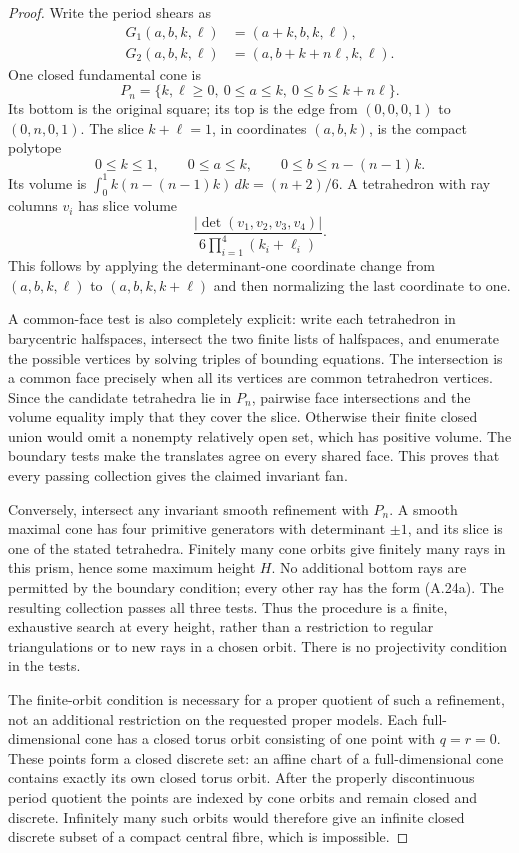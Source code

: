 \begin{proof}
Write the period shears as
\begin{align*}
 G_1(a,b,k,\ell)&=(a+k,b,k,\ell),\\
 G_2(a,b,k,\ell)&=(a,b+k+n\ell,k,\ell).
\end{align*}
One closed fundamental cone is
\[
 P_n=\{k,\ell\geq0,\ 0\leq a\leq k,
                    \ 0\leq b\leq k+n\ell\}.
\]
Its bottom is the original square; its top is the edge from
$(0,0,0,1)$ to $(0,n,0,1)$. The slice $k+\ell=1$, in
coordinates $(a,b,k)$, is the compact polytope
\[
 0\leq k\leq1,\qquad0\leq a\leq k,
 \qquad0\leq b\leq n-(n-1)k.
\]
Its volume is
$\int_0^1 k(n-(n-1)k)\,dk=(n+2)/6$.
A tetrahedron with ray columns $v_i$ has slice volume
\[
 \frac{|\det(v_1,v_2,v_3,v_4)|}
      {6\prod_{i=1}^4(k_i+\ell_i)}.
 \tag{A.24b}
\]
This follows by applying the determinant-one coordinate
change from $(a,b,k,\ell)$ to $(a,b,k,k+\ell)$ and then
normalizing the last coordinate to one.

A common-face test is also completely explicit: write each
tetrahedron in barycentric halfspaces, intersect the two
finite lists of halfspaces, and enumerate the possible
vertices by solving triples of bounding equations. The
intersection is a common face precisely when all its vertices
are common tetrahedron vertices. Since the candidate
tetrahedra lie in $P_n$, pairwise face intersections and the
volume equality imply that they cover the slice. Otherwise
their finite closed union would omit a nonempty relatively
open set, which has positive volume. The boundary tests make
the translates agree on every shared face. This proves that
every passing collection gives the claimed invariant fan.

Conversely, intersect any invariant smooth refinement with
$P_n$. A smooth maximal cone has four primitive generators
with determinant $\pm1$, and its slice is one of the stated
tetrahedra. Finitely many cone orbits give finitely many rays
in this prism, hence some maximum height $H$. No additional
bottom rays are permitted by the boundary condition; every
other ray has the form (A.24a). The resulting collection
passes all three tests. Thus the procedure is a finite,
exhaustive search at every height, rather than a restriction
to regular triangulations or to new rays in a chosen orbit.
There is no projectivity condition in the tests.

The finite-orbit condition is necessary for a proper quotient
of such a refinement, not an additional restriction on the
requested proper models. Each full-dimensional cone has a
closed torus orbit consisting of one point with $q=r=0$.
These points form a closed discrete set: an affine chart
of a full-dimensional cone contains exactly its own closed
torus orbit. After the properly discontinuous period
quotient the points are indexed by cone orbits and remain
closed and discrete. Infinitely many such orbits would
therefore give an infinite closed discrete subset of a
compact central fibre, which is impossible.


\end{proof}
